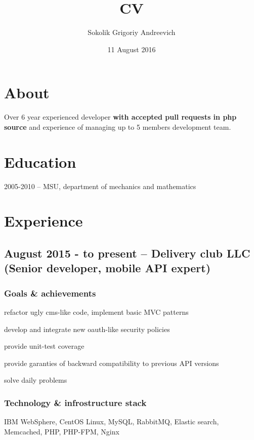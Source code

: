 \documentclass[9pt, a4paper, english]{extarticle}
\title {CV}
\author{Sokolik Grigoriy Andreevich}
\date {11 August 2016}
\begin{document}
\maketitle

\section* {About}
Over 6 year experienced developer \textbf{with accepted pull requests in php source} and experience of managing up to 5 members development team.

\section* {Education}
2005-2010 -- MSU, department of mechanics and mathematics


\section* {Experience}
  \subsection* {August 2015 - to present -- \textbf{Delivery club LLC} (Senior developer, mobile API expert)}
    \subsubsection* {Goals \& achievements}
      \begin {list}{\textbullet}{\itemsep=0mm}
        \item refactor ugly cms-like code, implement basic MVC patterns
        \item develop and integrate new oauth-like security policies
        \item provide unit-test coverage
        \item provide garanties of backward compatibility to previous API versions
        \item solve daily problems
      \end{list}
    \subsubsection* {Technology \& infrostructure stack}
      IBM WebSphere, CentOS Linux, MySQL, RabbitMQ, Elastic search, Memcached,
      PHP, PHP-FPM, Nginx
\end{document}
